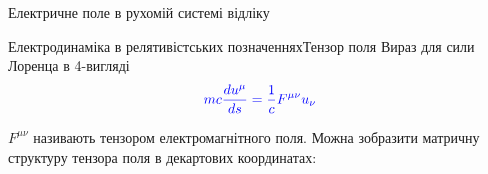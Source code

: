 \documentclass[]{beamer}
\begin{document}
\begin{frame}{Електричне поле в рухомій системі відліку}{}
\begin{center}
\begin{pict}
		\end{pict}
	\end{center}

\end{frame}




\begin{frame}{Електродинаміка в релятивістських позначеннях}{Тензор поля}\small
Вираз для сили Лоренца в 4-вигляді
\begin{equation*}\color{blue}
	mc\frac{du^{\mu}}{ds} = \frac1c F^{\mu\nu}u_{\nu}
\end{equation*}

$ F^{\mu\nu} $ називають тензором електромагнітного поля. Можна зобразити матричну структуру тензора поля в декартових координатах:


\end{frame}
\end{document}
